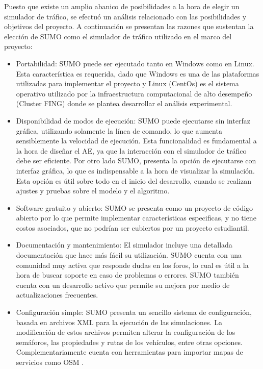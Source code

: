 Puesto que existe un amplio abanico de posibilidades a la hora de elegir un simulador de tráfico, se efectuó un análisis relacionado con las posibilidades y objetivos del proyecto. A continuación se presentan las razones que sustentan la elección de SUMO como el simulador de tráfico utilizado en el marco del proyecto:

\begin{itemize}
	\item Portabilidad: SUMO puede ser ejecutado tanto en Windows como en Linux. Esta característica es requerida, dado que Windows es una de las plataformas utilizadas para implementar el proyecto y Linux (CentOs) es el sistema operativo utilizado por la infraestructura computacional de alto desempeño (Cluster FING) donde se plantea desarrollar el análisis experimental.
	
	\item Disponibilidad de modos de ejecución: SUMO puede ejecutarse sin interfaz gráfica, utilizando solamente la línea de comando, lo que aumenta sensiblemente la velocidad de ejecución. Esta funcionalidad es fundamental a la hora de diseñar el AE, ya que la interacción con el simulador de tráfico debe ser eficiente. Por otro lado SUMO, presenta la opción de ejecutarse con interfaz gráfica, lo que es indispensable a la hora de visualizar la simulación. Esta opción es útil sobre todo en el inicio del desarrollo, cuando se realizan ajustes y pruebas sobre el modelo y el algoritmo.
	
	\item Software gratuito y abierto: SUMO se presenta como un proyecto de código abierto por lo que permite implementar características especificas, y no tiene costos asociados, que no podrían ser cubiertos por un proyecto estudiantil. 
	
	\item Documentación y mantenimiento: El simulador incluye una detallada documentación que hace más fácil su utilización. SUMO cuenta con una comunidad muy activa que responde dudas en los foros, lo cual es útil a la hora de buscar soporte en caso de problemas o errores. SUMO también cuenta con un desarrollo activo que permite su mejora por medio de actualizaciones frecuentes.
	
	\item Configuración simple: SUMO presenta un sencillo sistema de configuración, basada en archivos XML para la ejecución de las simulaciones. La modificación de estos archivos permiten alterar la configuración de los semáforos, las propiedades y rutas de los vehículos, entre otras opciones. Complementariamente cuenta con herramientas para importar mapas de servicios como OSM \citep{OSM}.
	

\end{itemize}
